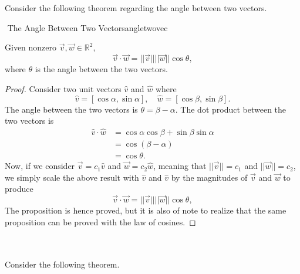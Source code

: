         \vphantom
        \\
        \\
        Consider the following theorem regarding the angle between two vectors.
        \begin{theorem}{\Stop\,\,The Angle Between Two Vectors}{angletwovec}
        
            Given nonzero \(\vec{v},\vec{w}\in\mathbb{R}^2\),
            \begin{equation*}
                \vec{v}\cdot\vec{w}=||\vec{v}||||\vec{w}||\cos\theta,
            \end{equation*}
            where \(\theta\) is the angle between the two vectors.
            \begin{proof}
                Consider two unit vectors \(\hat{v}\) and \(\hat{w}\) where
                \begin{equation*}
                    \hat{v}=[\cos\alpha,\sin\alpha],\quad\hat{w}=[\cos\beta,\sin\beta].
                \end{equation*}
                The angle between the two vectors is \(\theta=\beta-\alpha\). The dot product between the two vectors is
                \begin{align*}
                    \hat{v}\cdot\hat{w}&=\cos\alpha\cos\beta+\sin\beta\sin\alpha \\
                    &=\cos(\beta-\alpha) \\
                    &=\cos\theta.
                \end{align*}
                Now, if we consider \(\vec{v}=c_1\hat{v}\) and \(\vec{w}=c_2\hat{w}\), meaning that \(||\vec{v}||=c_1\) and \(||\vec{w}||=c_2\), we simply scale the above result with \(\hat{v}\) and \(\hat{v}\) by the magnitudes of \(\vec{v}\) and \(\vec{w}\) to produce
                \begin{equation*}
                \vec{v}\cdot\vec{w}=||\vec{v}||||\vec{w}||\cos\theta,
            \end{equation*}
                The proposition is hence proved, but it is also of note to realize that the same proposition can be proved with the law of cosines.
            \end{proof}
        
        \end{theorem}
        \pagebreak
        \vphantom
        \\
        \\
        Consider the following theorem.
